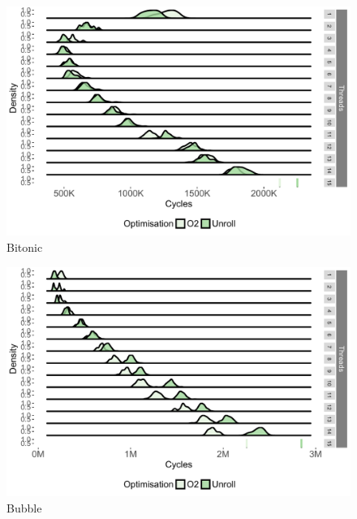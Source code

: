 \begin{appendices}
\begin{figure}[!htb]
\center
\includegraphics[width=1\textwidth]{streamit-paper/graphics/appendixgraphs/bitonic-total.pdf}
\caption{Bitonic}\label{chp:stream:bt2}
\end{figure}

\begin{figure}[!htb]
\center
\includegraphics[width=1\textwidth]{streamit-paper/graphics/appendixgraphs/bubble-total.pdf}
\caption{Bubble}\label{chp:stream:bt3}
\end{figure}


\end{appendices}
